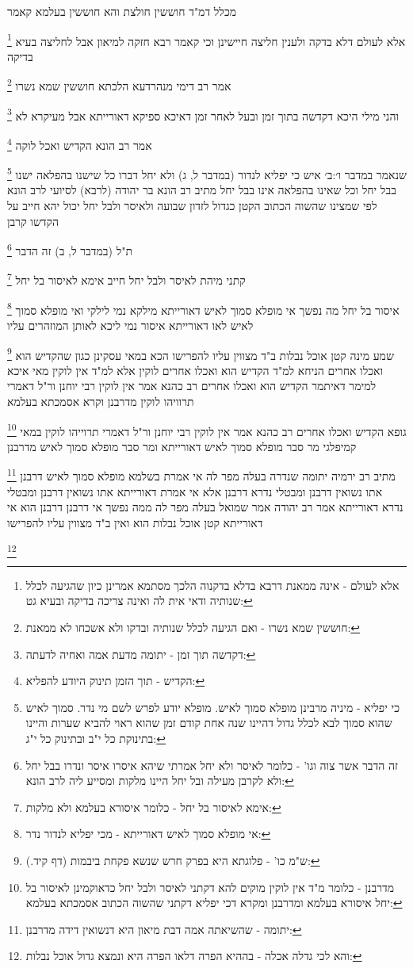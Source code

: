 \documentclass[12pt, openany]{book}
\newcommand{\footnotecomment}[1]{
	\renewcommand\thefootnote{}
	\footnote{#1}}
\newcommand{\commenta}[1]{\footnotecomment{#1}}
\begin{document}
{{מכלל דמ"ד חוששין חולצת והא חוששין בעלמא קאמר 
\commenta{אלא לעולם - אינה ממאנת דרבא בדלא בדקנוה הלכך מסתמא אמרינן כיון שהגיעה לכלל שנותיה ודאי אית לה ואינה צריכה בדיקה ובעיא גט: }
אלא לעולם דלא בדקה ולענין חליצה חיישינן וכי קאמר רבא חזקה למיאון אבל לחליצה בעיא בדיקה 
\commenta{חוששין שמא נשרו - ואם הגיעה לכלל שנותיה ובדקו ולא אשכחו לא ממאנת:}
אמר רב דימי מנהרדעא הלכתא חוששין שמא נשרו 
\commenta{דקדשה תוך זמן - יתומה מדעת אמה ואחיה לדעתה:}
והני מילי היכא דקדשה בתוך זמן ובעל לאחר זמן דאיכא ספיקא דאורייתא אבל מעיקרא לא 
\commenta{הקדיש - תוך הזמן תינוק היודע להפליא:}
אמר רב הונא הקדיש ואכל לוקה
\commenta{כי יפליא - מיניה מרבינן מופלא סמוך לאיש. מופלא יודע לפרש לשם מי נדר. סמוך לאיש שהוא סמוך לבא לכלל גדול דהיינו שנה אחת קודם זמן שהוא ראוי להביא שערות והיינו בתינוקת כל י"ב ובתינוק כל י"ג:}
שנאמר {במדבר ו׳:ב׳ } איש כי יפליא לנדור (במדבר ל, ג) ולא יחל דברו כל שישנו בהפלאה ישנו בבל יחל וכל שאינו בהפלאה אינו בבל יחל 
מתיב רב הונא בר יהודה (לרבא) לסיועי לרב הונא
לפי שמצינו שהשוה הכתוב הקטן כגדול לזדון שבועה ולאיסר ולבל יחל יכול יהא חייב על הקדשו קרבן 
\commenta{זה הדבר אשר צוה וגו' - כלומר לאיסר ולא יחל אמרתי שיהא איסרו איסר ונדרו בבל יחל ולא לקרבן מעילה ובל יחל היינו מלקות ומסייע ליה לרב הונא:}
ת"ל (במדבר ל, ב) זה הדבר 
\commenta{אימא לאיסור בל יחל - כלומר איסורא בעלמא ולא מלקות:}
קתני מיהת לאיסר ולבל יחל חייב אימא לאיסור בל יחל 
\commenta{אי מופלא סמוך לאיש דאורייתא - מכי יפליא לנדור נדר:}
איסור בל יחל מה נפשך אי מופלא סמוך לאיש דאורייתא מילקא נמי לילקי ואי מופלא סמוך לאיש לאו דאורייתא איסור נמי ליכא לאותן המוזהרים עליו 
\commenta{ש"מ כו' - פלוגתא היא בפרק חרש שנשא פקחת ביבמות (דף קיד.):}
שמע מינה קטן אוכל נבלות ב"ד מצווין עליו להפרישו הכא במאי עסקינן כגון שהקדיש הוא ואכלו אחרים 
הניחא למ"ד הקדיש הוא ואכלו אחרים לוקין אלא למ"ד אין לוקין מאי איכא למימר דאיתמר הקדיש הוא ואכלו אחרים רב כהנא אמר אין לוקין רבי יוחנן ור"ל דאמרי תרוויהו לוקין 
מדרבנן וקרא אסמכתא בעלמא 
\commenta{מדרבנן - כלומר מ"ד אין לוקין מוקים להא דקתני לאיסר ולבל יחל כדאוקמינן לאיסור בל יחל איסורא בעלמא ומדרבנן ומקרא דכי יפליא דקתני שהשוה הכתוב אסמכתא בעלמא:}
גופא הקדיש ואכלו אחרים רב כהנא אמר אין לוקין רבי יוחנן ור"ל דאמרי תרוייהו לוקין במאי קמיפלגי מר סבר מופלא סמוך לאיש דאורייתא ומר סבר מופלא סמוך לאיש מדרבנן 
\commenta{יתומה - שהשיאתה אמה דבת מיאון היא דנשואין דידה מדרבנן:}
מתיב רב ירמיה יתומה שנדרה בעלה מפר לה אי אמרת בשלמא מופלא סמוך לאיש דרבנן אתו נשואין דרבנן ומבטלי נדרא דרבנן אלא אי אמרת דאורייתא אתו נשואין דרבנן ומבטלי נדרא דאורייתא 
אמר רב יהודה אמר שמואל בעלה מפר לה ממה נפשך אי דרבנן דרבנן הוא אי דאורייתא קטן אוכל נבלות הוא ואין ב"ד מצווין עליו להפרישו 
\commenta{והא לכי גדלה אכלה - בההיא הפרה דלאו הפרה היא ונמצא גדול אוכל נבלות:}
}}
\end{document}
